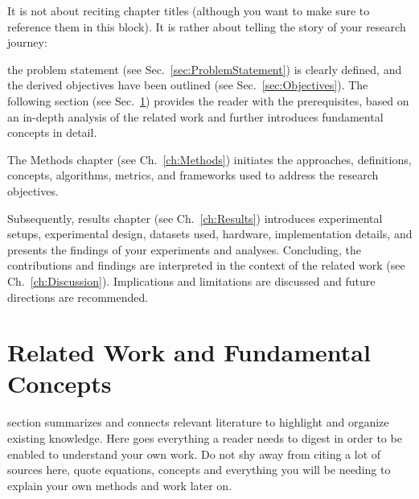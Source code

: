  It is not about reciting chapter titles (although you want to make sure to 
reference them in this block). It is rather about telling the story of your research journey:



 the problem statement (see Sec.~\ref{sec:ProblemStatement}) is clearly defined, and the derived objectives have been outlined (see Sec.~\ref{sec:Objectives}).
The following section (see Sec.~\ref{sec:RelatedWork}) provides the reader with the prerequisites, 
based on an in-depth analysis of the related work and further introduces fundamental concepts in detail. 


The Methods chapter (see Ch.~\ref{ch:Methods}) initiates the approaches, definitions, concepts, algorithms, metrics, and frameworks used to address the research objectives.

Subsequently, results chapter (see Ch.~\ref{ch:Results}) introduces experimental setups, experimental design, datasets used, hardware, implementation details, 
and presents the findings of your experiments and analyses. 
Concluding, the contributions and findings are interpreted in the context of the related work (see Ch.~\ref{ch:Discussion}). 
Implications and limitations are discussed and future directions are recommended. 



\newpage
\section{Related Work and Fundamental Concepts}\label{sec:RelatedWork}

 section summarizes and connects relevant literature to highlight and organize existing knowledge.
Here goes everything a reader needs to digest in order to be enabled to understand your own work. Do not shy away from citing a lot of sources here, quote 
equations, concepts and everything you will be needing to explain your own methods and work later on. 

